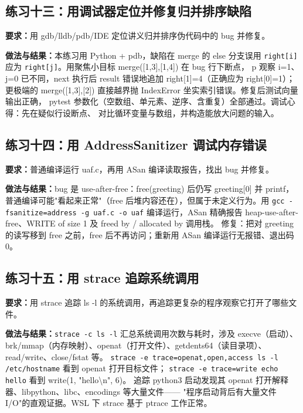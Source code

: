 \documentclass[UTF8]{ctexart}
\begin{document}
\subsection{练习十三：用调试器定位并修复归并排序缺陷}

\noindent\textbf{要求：}用 gdb/lldb/pdb/IDE 定位讲义归并排序伪代码中的 bug 并修复。

\noindent\textbf{做法与结果：}本练习用 Python + pdb，缺陷在 merge 的 else 分支误用 \texttt{right[i]}
应为 \texttt{right[j]}。用聚焦小目标 merge([1,3],[1,4]) 在 bug 行下断点，
p 观察 i=1、j=0 已不同，next 执行后 result 错误地追加 right[1]=4（正确应为 right[0]=1）；
更极端的 merge([1,3],[2]) 直接越界抛 IndexError 坐实索引错误。修复后测试向量输出正确，
pytest 参数化（空数组、单元素、逆序、含重复）全部通过。调试心得：先在疑似行设断点、
对比循环变量与数组，并构造能放大问题的输入。

\subsection{练习十四：用 AddressSanitizer 调试内存错误}

\noindent\textbf{要求：}普通编译运行 uaf.c，再用 ASan 编译读取报告，找出 bug 并修复。

\noindent\textbf{做法与结果：}bug 是 use-after-free：free(greeting) 后仍写 greeting[0] 并 printf，
普通编译可能"看起来正常"（free 后堆内容还在），但属于未定义行为。用
\texttt{gcc -fsanitize=address -g uaf.c -o uaf} 编译运行，ASan 精确报告
heap-use-after-free、WRITE of size 1 及 freed by / allocated by 调用栈。
修复：把对 greeting 的读写移到 free 之前，free 后不再访问；重新用 ASan 编译运行无报错、退出码 0。

\subsection{练习十五：用 strace 追踪系统调用}

\noindent\textbf{要求：}用 strace 追踪 ls -l 的系统调用，再追踪更复杂的程序观察它打开了哪些文件。

\noindent\textbf{做法与结果：}\texttt{strace -c ls -l} 汇总系统调用次数与耗时，涉及 execve（启动）、
brk/mmap（内存映射）、openat（打开文件）、getdents64（读目录项）、read/write、close/fstat 等。
\texttt{strace -e trace=openat,open,access ls -l /etc/hostname} 看到 openat 打开目标文件；
\texttt{strace -e trace=write echo hello} 看到 write(1, "hello\textbackslash n", 6)。
追踪 python3 启动发现其 openat 打开解释器、libpython、libc、encodings 等大量文件——
"程序启动背后有大量文件 I/O"的直观证据。WSL 下 strace 基于 ptrace 工作正常。
\end{document}
